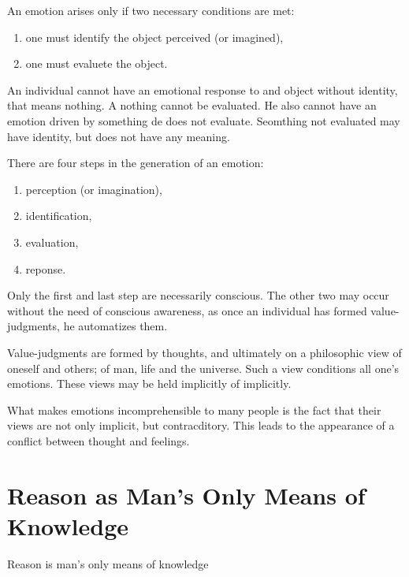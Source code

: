         An emotion arises only if two necessary conditions are met:

        \begin{enumerate}
            \item one must identify the object perceived (or imagined),
            \item one must evaluete the object.
        \end{enumerate}
    
        An individual cannot have an emotional response to and object without identity, that means nothing. A nothing cannot be evaluated. He also cannot have an emotion driven by something de does not evaluate. Seomthing not evaluated may have identity, but does not have any meaning.
    
        There are four steps in the generation of an emotion:

        \begin{enumerate}
            \item perception (or imagination),
            \item identification,
            \item evaluation,
            \item reponse.
        \end{enumerate}
    
        Only the first and last step are necessarily conscious. The other two may occur without the need of conscious awareness, as once an individual has formed value-judgments, he automatizes them.
        
        Value-judgments are formed by thoughts, and ultimately on a philosophic view of oneself and others; of man, life and the universe. Such a view conditions all one's emotions. These views may be held implicitly of implicitly.
        
        What makes emotions incomprehensible to many people is the fact that their views are not only implicit, but contracditory. This leads to the appearance of a conflict between thought and feelings.

    \section{Reason as Man's Only Means of Knowledge}
    
            \begin{theorem}
                Reason is man's only means of knowledge
            \end{theorem}


